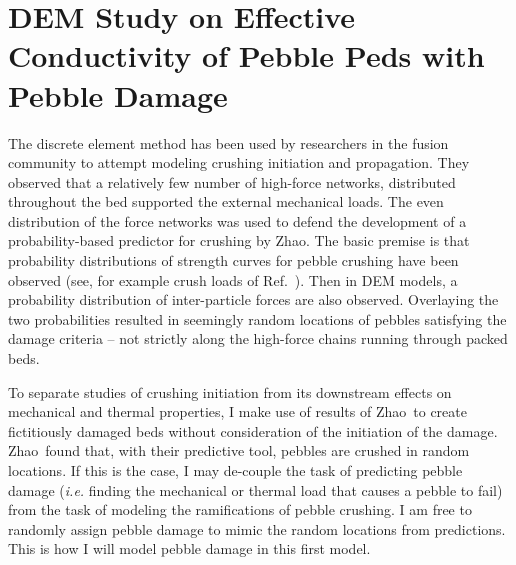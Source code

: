 \section{DEM Study on Effective Conductivity of Pebble Peds with Pebble Damage}\label{sec:dem-studies-effective-conductivity}


The discrete element method has been used by researchers in the fusion community to attempt modeling crushing initiation and propagation\cite{Annabattula2012a, Zhao2012, Zhao2013}. They observed that a relatively few number of high-force networks, distributed throughout the bed supported the external mechanical loads. The even distribution of the force networks was used to defend the development of a probability-based predictor for crushing by Zhao\etal.\cite{Zhao2013} The basic premise is that probability distributions of strength curves for pebble crushing have been observed (see, for example crush loads of Ref.~\cite{Tsuchiya1998}). Then in DEM models, a probability distribution of inter-particle forces are also observed. Overlaying the two probabilities resulted in seemingly random locations of pebbles satisfying the damage criteria -- not strictly along the high-force chains running through packed beds.

To separate studies of crushing initiation from its downstream effects on mechanical and thermal properties, I make use of results of Zhao\etal~to create fictitiously damaged beds without consideration of the initiation of the damage. Zhao\etal~found that, with their predictive tool, pebbles are crushed in random locations. If this is the case, I may de-couple the task of predicting pebble damage (\textit{i.e.} finding the mechanical or thermal load that causes a pebble to fail) from the task of modeling the ramifications of pebble crushing. I am free to randomly assign pebble damage to mimic the random locations from predictions. This is how I will model pebble damage in this first model.

